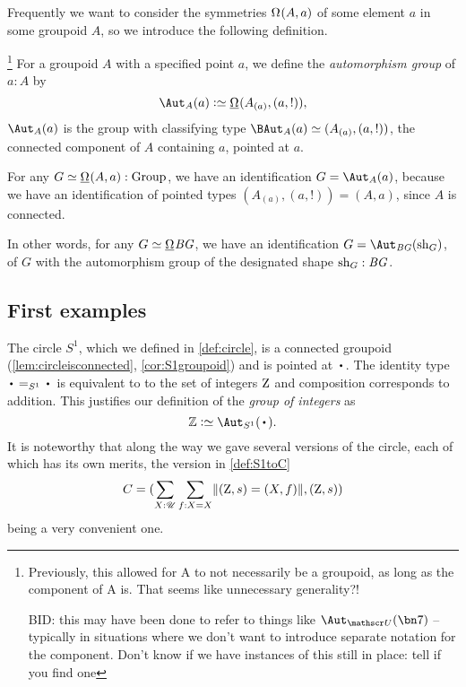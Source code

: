 Frequently we want to consider the symmetries $\loops(A,a)$ of some element $a$ in some groupoid $A$, so we introduce the following definition.

\begin{definition}\label{def:automorphism-group}
  \footnote{ Previously, this allowed for A to not necessarily be a groupoid,
    as long as the component of A is. That seems like unnecessary generality?!

    BID: this may have been done to refer to things like $\aut_{\UU}(\bn 7)$ -- typically in situations where we don't want to introduce separate notation for the component.
    Don't know if we have instances of this still in place: tell if you find one}
  For a groupoid $A$ with a specified point $a$,
  we define the \emph{automorphism group} of $a:A$ by
  \[
    \Aut_A(a) \defeq \mkgroup (A_{(a)},(a,!)),
  \]
  \ie $\Aut_A(a)$ is the group with classifying type
  $\BAut_A(a) \jdeq (A_{(a)},(a,!))$,
  the connected component of $A$ containing $a$, pointed at $a$.
\end{definition}
\begin{remark}
  \label{rem:symmetriesofnonconnectedgroupoids}
  For any $G \jdeq \mkgroup(A,a) : \Group$, we have an identification
  $G = \Aut_A(a)$,
  because we have an identification of pointed types $(A_{(a)},(a,!)) = (A,a)$,
  since $A$ is connected.

  In other words, for any $G \jdeq \mkgroup\BG$, we have
  an identification $G = \Aut_{\BG}(\shape_G)$, of $G$ with the automorphism
  group of the designated shape $\mathrm{sh}_G : \mathit{B}\mathit{G}$.
\end{remark}

\subsection{First examples}
\label{sec:firstgroupexamples}
   \begin{example}\label{excirclegroup}
   The circle $S^1$, which we defined in \cref{def:circle}, is a connected groupoid (\cref{lem:circleisconnected}, \cref{cor:S1groupoid}) and is pointed at $\base$. The identity type $\base=_{S^1}\base$ is equivalent to to the set of integers $\mathrm{Z}$ and composition corresponds to addition.  This justifies our definition of the \emph{group of integers} as
$$\ZZ \defeq \aut_{S^1}(\base).$$
It is noteworthy that along the way we gave several versions of the circle, each of which has its own merits, the version in \cref{def:S1toC}
$$C=(\sum_{X:{\mathscr{U}}}\sum_{f:X=X}\lVert(\mathrm{Z},s)=(X,f)\rVert, (\mathrm{Z},s))$$
being a very convenient one.
 \end{example}

